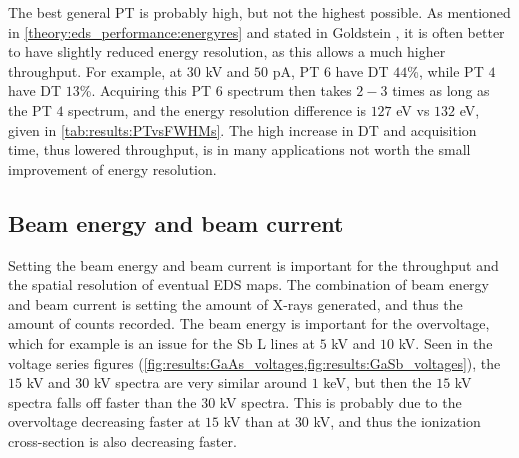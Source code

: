 The best general PT is probably high, but not the highest possible.
As mentioned in \cref{theory:eds_performance:energyres} and stated in Goldstein \cite{goldstein_scanning_2018}, it is often better to have slightly reduced energy resolution, as this allows a much higher throughput.
For example, at $30$ kV and $50$ pA, PT $6$ have DT $44$\%, while PT $4$ have DT $13$\%.
Acquiring this PT $6$ spectrum then takes $2-3$ times as long as the PT $4$ spectrum, and the energy resolution difference is $127$ eV vs $132$ eV, given in \cref{tab:results:PTvsFWHMs}.
The high increase in DT and acquisition time, thus lowered throughput, is in many applications not worth the small improvement of energy resolution.



\subsection{Beam energy and beam current}
\label{discussion:beam_energy_current}

Setting the beam energy and beam current is important for the throughput and the spatial resolution of eventual EDS maps.
The combination of beam energy and beam current is setting the amount of X-rays generated, and thus the amount of counts recorded.
The beam energy is important for the overvoltage, which for example is an issue for the Sb L lines at $5$ kV and $10$ kV.
Seen in the voltage series figures (\cref{fig:results:GaAs_voltages,fig:results:GaSb_voltages}), the $15$ kV and $30$ kV spectra are very similar around $1$ keV, but then the $15$ kV spectra falls off faster than the $30$ kV spectra.
This is probably due to the overvoltage decreasing faster at $15$ kV than at $30$ kV, and thus the ionization cross-section is also decreasing faster.


